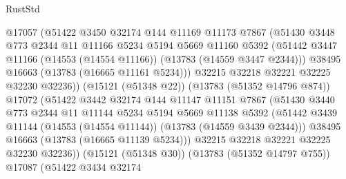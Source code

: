 \begin{lexlean}{RustStd}
\begin{coremodule}
                        @17057
                        (@51422
                          @3450
                          @32174
                          @144
                          @11169
                          @11173
                          @7867
                          (@51430
                            @3448
                            @773
                            @2344
                            @11
                            @11166
                            @5234
                            @5194
                            @5669
                            @11160
                            @5392
                            (@51442
                              @3447
                              @11166
                              (@14553 (@14554 @11166))
                              (@13783 (@14559 @3447 @2344)))
                            @38495
                            @16663
                            (@13783 (@16665 @11161 @5234)))
                          @32215
                          @32218
                          @32221
                          @32225
                          @32230
                          @32236))
                      (@15121 (@51348 @22))
                      (@13783 (@51352 @14796 @874))
                      @17072
                      (@51422
                        @3442
                        @32174
                        @144
                        @11147
                        @11151
                        @7867
                        (@51430
                          @3440
                          @773
                          @2344
                          @11
                          @11144
                          @5234
                          @5194
                          @5669
                          @11138
                          @5392
                          (@51442
                            @3439
                            @11144
                            (@14553 (@14554 @11144))
                            (@13783 (@14559 @3439 @2344)))
                          @38495
                          @16663
                          (@13783 (@16665 @11139 @5234)))
                        @32215
                        @32218
                        @32221
                        @32225
                        @32230
                        @32236))
                    (@15121 (@51348 @30))
                    (@13783 (@51352 @14797 @755))
                    @17087
                    (@51422
                      @3434
                      @32174

\end{coremodule}
\end{lexlean}
